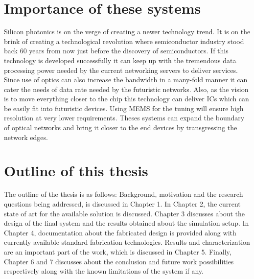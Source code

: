 \documentclass[../main.tex]{subfiles}
\begin{document}
	\section{Importance of these systems}
Silicon photonics is on the verge of creating a newer technology trend. It is on the brink of creating a technological revolution where semiconductor industry stood back 60 years from now just before the discovery of semiconductors. If this technology is developed successfully it can keep up with the tremendous data processing power needed by the current networking servers to deliver services. Since use of optics can also increase the bandwidth in a many-fold manner it can cater the needs of data rate needed by the futuristic networks. Also, as the vision is to move everything closer to the chip this technology can deliver ICs which can be easily fit into futuristic devices. Using MEMS for the tuning will ensure high resolution at very lower requirements. Theses systems can expand the boundary of optical networks and bring it closer to the end devices by transgressing the network edges.
	
	\section{Outline of this thesis}
The outline of the thesis is as follows: Background, motivation and the research
questions being addressed, is discussed in Chapter 1. In Chapter 2, the current state of art for the available solution is discussed. Chapter 3 discusses about the design of the final system and the results obtained about the simulation setup. In Chapter 4, documentation about the fabricated design is provided along with currently available standard fabrication technologies. Results and characterization are an important part of the work, which is discussed in Chapter 5. Finally, Chapter 6 and 7 discusses about the conclusion and future work possibilities respectively along with the known limitations of the system if any.  
	
\end{document}
